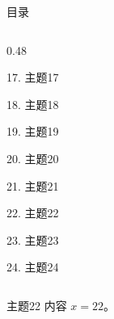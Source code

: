\documentclass[aspectratio=169,10pt,fontset=fandol]{ctexbeamer}
\begin{document}
\begin{frame}[t,fragile]{目录}
\begin{columns}[T,onlytextwidth]
\begin{column}{0.48\textwidth}
{\color{black}\small 17. 主题17\par}\vspace{0.22em}
{\color{black}\small 18. 主题18\par}\vspace{0.22em}
{\color{black}\small 19. 主题19\par}\vspace{0.22em}
{\color{black}\small 20. 主题20\par}\vspace{0.22em}
{\color{black}\small 21. 主题21\par}\vspace{0.22em}
{\color{blue}\small 22. 主题22\par}\vspace{0.22em}
{\color{gray!40}\small 23. 主题23\par}\vspace{0.22em}
{\color{gray!40}\small 24. 主题24\par}\vspace{0.22em}
\end{column}
\end{columns}
\end{frame}
\begin{frame}[t,fragile]{主题22}
\normalsize
{\normalsize
内容 $x=22$。
}
\end{frame}
\end{document}

